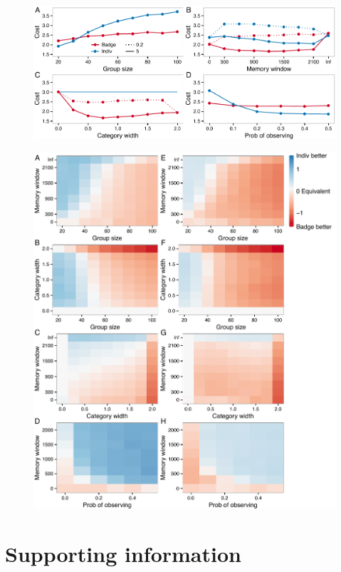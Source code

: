 \begin{figure}
\includegraphics[width=6.85in]{figures/costs.pdf}
\caption{}
\end{figure}

\begin{figure}
\includegraphics[width=6.85in]{figures/cost_comparisons.pdf}
\caption{}
\end{figure}

\clearpage{}
\renewcommand{\thesection}{}
\section{Supporting information}
\renewcommand{\thesection}{S}
\renewcommand{\thesubsection}{S\arabic{subsection}}
\renewcommand{\theequation}{S\arabic{equation}}
\renewcommand{\thetable}{S\arabic{table}}
\renewcommand{\thefigure}{S\arabic{figure}}
\setcounter{equation}{0}  
\setcounter{figure}{0}
\setcounter{table}{0}

